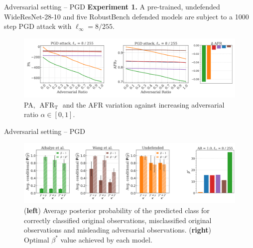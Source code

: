 \begin{frame}{Adversarial setting -- PGD}
	\textbf{Experiment 1.}
	A pre-trained, undefended WideResNet-28-10 and five RobustBench
	defended models are subject to a 1000 step PGD attack with $\ell_\infty = 8/255$.

	\begin{figure}[H]
		\centering
		\includegraphics[width=\textwidth]{img/adversarial/PGD_0.0314_combo2.png}
		\caption{
		PA, $\operatorname{AFR}_\text{T}$ and the AFR variation against increasing 
		adversarial ratio $\alpha \in [0,1]$.
		}
		\label{fig:six_figures_pa_adv}
	\end{figure}
\end{frame}

\begin{frame}{Adversarial setting -- PGD}

	\begin{figure}[H]
		\centering
		\includegraphics[width=\textwidth]{img/adversarial/bpda_wang_undefended_beta_pgd.png}
		\caption{
			(\textbf{left}) Average posterior probability of the predicted class for 
			correctly classified original observations, misclassified original observations and 
			misleading adversarial observations. (\textbf{right}) Optimal $\beta^{*}$ value achieved by each 
			model.
		}
		\label{fig:six_figures_pa_adv}
	\end{figure}
\end{frame}


